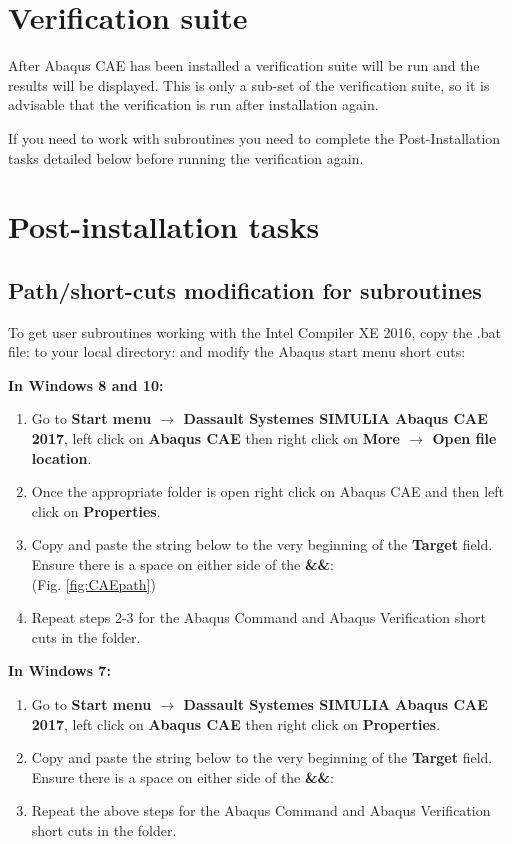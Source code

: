 \documentclass[10pt,a4paper,oneside]{article}
\begin{document}
\section{Verification suite}
After Abaqus CAE has been installed a verification suite will be run and the results will be displayed. This is only a sub-set of the verification suite, so it is advisable that the verification is run after installation again. 

If you need to work with subroutines you need to complete the Post-Installation tasks detailed below before running the verification again.

\section{Post-installation tasks}
\subsection{Path/short-cuts modification for subroutines} \label{sec:path}
To get user subroutines working with the Intel Compiler XE 2016, copy the .bat file:  to your local directory:  and modify the Abaqus start menu short cuts:

\textbf{In Windows 8 and 10:}
\begin{enumerate}
\item Go to \textbf{Start menu $\rightarrow$ Dassault Systemes SIMULIA Abaqus CAE 2017}, left click on \textbf{Abaqus CAE} then right click on \textbf{More $\rightarrow$ Open file location}.
\item Once the appropriate folder is open right click on Abaqus CAE and then left click on \textbf{Properties}. 
\item Copy and paste the string below to the very beginning of the \textbf{Target} field. Ensure there is a space on either side of the \textbf{\&\&}:\\
\textbf{} (Fig. \ref{fig:CAEpath})
\item Repeat steps 2-3 for the Abaqus Command and Abaqus Verification short cuts in the folder.
\end{enumerate}

\textbf{In Windows 7:}
\begin{enumerate}
\item Go to \textbf{Start menu $\rightarrow$ Dassault Systemes SIMULIA Abaqus CAE 2017}, left click on \textbf{Abaqus CAE} then right click on \textbf{Properties}.
\item Copy and paste the string below to the very beginning of the \textbf{Target} field. Ensure there is a space on either side of the \textbf{\&\&}:\\
\textbf{}
\item Repeat the above steps for the Abaqus Command and Abaqus Verification short cuts in the folder.
\end{enumerate}
\end{document}
